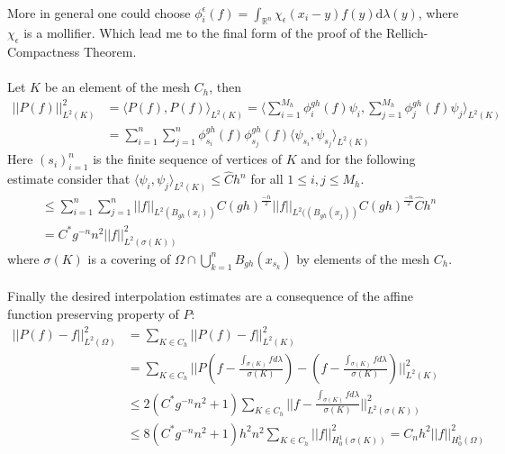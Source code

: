 \documentclass[11pt,a4paper,leqno]{report}
\numberwithin{equation}{chapter}
\begin{document}
\\
More in general one could choose $\phi_i^\epsilon(f)=\int_{\mathbb{R}^n}\chi_\epsilon(x_i-y)f(y)\mathrm{d}\lambda(y)$, where $\chi_\epsilon$ is a mollifier. Which lead me to the final form of the proof of the Rellich-Compactness Theorem. \\
\\
Let $K$ be an element of the mesh $C_h$, then
\begin{align*}||P(f)||_{L^2(K)}^2&=\langle P(f),P(f)\rangle_{L^2(K)}=\langle \sum_{i=1}^{M_h}\phi_i^{g h}(f)\psi_i,\sum_{j=1}^{M_h}\phi_j^{g h}(f)\psi_j\rangle_{L^2(K)}\\
&=\sum_{i=1}^{n}\sum_{j=1}^{n}\phi_{s_i}^{g h}(f)\phi_{s_j}^{g h}(f)\langle\psi_{s_i},\psi_{s_j}\rangle_{L^2(K)}\end{align*}
Here $(s_i)_{i=1}^n$ is the finite sequence of vertices of $K$ and for the following estimate consider that $\langle\psi_{i},\psi_{j}\rangle_{L^2(K)}\leq\hat{C}h^n$ for all $1\leq i,j\leq M_h$.
\begin{align*}&\leq \sum_{i=1}^{n}\sum_{j=1}^{n}||f||_{L^2(B_{gh}(x_i))}C(gh)^\frac{-n}{2}||f||_{L^2((B_{gh}(x_j))}C(gh)^\frac{-n}{2}\hat{C}h^n\\
&=C^*g^{-n}n^2||f||_{L^2(\sigma(K))}^2\end{align*}
where $\sigma(K)$ is a covering of $\Omega\cap\bigcup_{k=1}^nB_{gh}(x_{s_k})$ by elements of the mesh $C_h$.\\
\\
Finally the desired interpolation estimates are a consequence of the affine function preserving property of $P$:
\begin{align*}||P(f)-f||_{L^2(\Omega)}^2&=\sum_{K\in C_h}||P(f)-f||_{L^2(K)}^2\\
&=\sum_{K\in C_h}||P(f-\frac{\int_{\sigma(K)}fd\lambda}{\sigma(K)})-(f-\frac{\int_{\sigma(K)}fd\lambda}{\sigma(K)})||_{L^2(K)}^2\\
&\leq 2(C^*g^{-n}n^2+1)\sum_{K\in C_h}||f-\frac{\int_{\sigma(K)}fd\lambda}{\sigma(K)}||_{L^2(\sigma(K))}^2\\
&\leq 8(C^*g^{-n}n^2+1)h^2 n^2\sum_{K\in C_h}||f||_{H^1_0(\sigma(K))}^2=C_n h^2||f||_{H^1_0(\Omega)}^2\end{align*}
\end{document}
